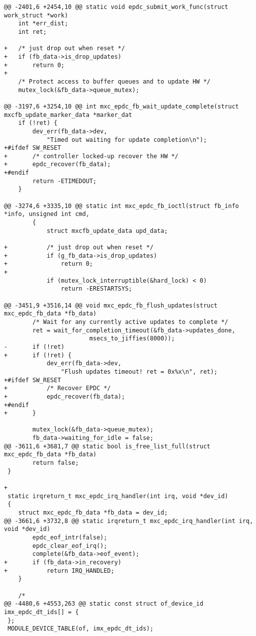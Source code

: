 \documentclass{memoir}
\begin{document}
\begin{verbatim}
@@ -2401,6 +2454,10 @@ static void epdc_submit_work_func(struct work_struct *work)
 	int *err_dist;
 	int ret;
 
+	/* just drop out when reset */
+	if (fb_data->is_drop_updates)
+		return 0;
+
 	/* Protect access to buffer queues and to update HW */
 	mutex_lock(&fb_data->queue_mutex);
 
@@ -3197,6 +3254,10 @@ int mxc_epdc_fb_wait_update_complete(struct mxcfb_update_marker_data *marker_dat
 	if (!ret) {
 		dev_err(fb_data->dev,
 			"Timed out waiting for update completion\n");
+#ifdef SW_RESET
+		/* controller locked-up recover the HW */
+		epdc_recover(fb_data);
+#endif
 		return -ETIMEDOUT;
 	}
 
@@ -3274,6 +3335,10 @@ static int mxc_epdc_fb_ioctl(struct fb_info *info, unsigned int cmd,
 		{
 			struct mxcfb_update_data upd_data;
 
+			/* just drop out when reset */
+			if (g_fb_data->is_drop_updates)
+				return 0;
+
 			if (mutex_lock_interruptible(&hard_lock) < 0)
 				return -ERESTARTSYS;
 
@@ -3451,9 +3516,14 @@ void mxc_epdc_fb_flush_updates(struct mxc_epdc_fb_data *fb_data)
 		/* Wait for any currently active updates to complete */
 		ret = wait_for_completion_timeout(&fb_data->updates_done,
 						msecs_to_jiffies(8000));
-		if (!ret)
+		if (!ret) {
 			dev_err(fb_data->dev,
 				"Flush updates timeout! ret = 0x%x\n", ret);
+#ifdef SW_RESET
+			/* Recover EPDC */
+			epdc_recover(fb_data);
+#endif
+		}
 
 		mutex_lock(&fb_data->queue_mutex);
 		fb_data->waiting_for_idle = false;
@@ -3611,6 +3681,7 @@ static bool is_free_list_full(struct mxc_epdc_fb_data *fb_data)
 		return false;
 }
 
+
 static irqreturn_t mxc_epdc_irq_handler(int irq, void *dev_id)
 {
 	struct mxc_epdc_fb_data *fb_data = dev_id;
@@ -3661,6 +3732,8 @@ static irqreturn_t mxc_epdc_irq_handler(int irq, void *dev_id)
 		epdc_eof_intr(false);
 		epdc_clear_eof_irq();
 		complete(&fb_data->eof_event);
+		if (fb_data->in_recovery)
+			return IRQ_HANDLED;
 	}
 
 	/*
@@ -4480,6 +4553,263 @@ static const struct of_device_id imx_epdc_dt_ids[] = {
 };
 MODULE_DEVICE_TABLE(of, imx_epdc_dt_ids);
 

\end{verbatim}
\end{document}
